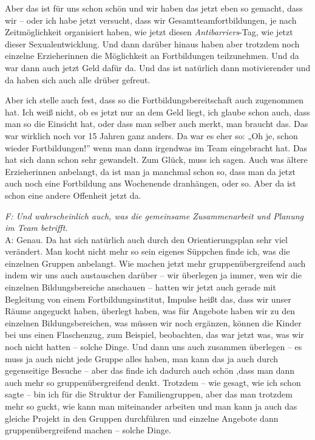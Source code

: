 \begin{linenumbers*}
Aber das ist für uns schon schön und wir haben das jetzt eben so gemacht, dass wir – oder ich habe jetzt versucht, dass wir Gesamtteamfortbildungen, je nach Zeitmöglichkeit organisiert haben, wie jetzt diesen \emph{Antibarriers}-Tag, wie jetzt dieser Sexualentwicklung. Und dann darüber hinaus haben aber trotzdem noch einzelne Erzieherinnen die Möglichkeit an Fortbildungen teilzunehmen. Und da war dann auch jetzt Geld dafür da. Und das ist natürlich dann motivierender und da haben sich auch alle drüber gefreut. 

Aber ich stelle auch fest, dass so die Fortbildungsbereitschaft auch zugenommen hat. Ich weiß nicht, ob es jetzt nur an dem Geld liegt, ich glaube schon auch, dass man so die Einsicht hat, oder dass man selber auch merkt, man braucht das. Das war wirklich noch vor 15 Jahren ganz anders. Da war es eher so: „Oh je, schon wieder Fortbildungen!” wenn man dann irgendwas im Team eingebracht hat. Das hat sich dann schon sehr gewandelt. Zum Glück, muss ich sagen. Auch was ältere Erzieherinnen anbelangt, da ist man ja manchmal schon so, dass man da jetzt auch noch eine Fortbildung ans Wochenende dranhängen, oder so. Aber da ist schon eine andere Offenheit jetzt da. 

\emph{F: Und wahrscheinlich auch, was die gemeinsame Zusammenarbeit und Planung im Team betrifft.}\\
A: Genau. Da hat sich natürlich auch durch den Orientierungsplan sehr viel verändert. Man kocht nicht mehr so sein eigenes Süppchen finde ich, was die einzelnen Gruppen anbelangt. Wie machen jetzt mehr gruppenübergreifend auch indem wir uns auch austauschen darüber – wir überlegen ja immer, wen wir die einzelnen Bildungsbereiche anschauen – hatten wir jetzt auch gerade mit Begleitung von einem Fortbildungsinstitut, Impulse heißt das, dass wir unser Räume angeguckt haben, überlegt haben, was für Angebote haben wir zu den einzelnen Bildungsbereichen, was müssen wir noch ergänzen, können die Kinder bei uns einen Flaschenzug, zum Beispiel, beobachten, das war jetzt was, was wir noch nicht hatten – solche Dinge. Und dann uns auch zusammen überlegen – es muss ja auch nicht jede Gruppe alles haben, man kann das ja auch durch gegenseitige Besuche – aber das finde ich dadurch auch schön ,dass man dann auch mehr so gruppenübergreifend denkt. Trotzdem – wie gesagt, wie ich schon sagte – bin ich für die Struktur der Familiengruppen, aber das man trotzdem mehr so guckt, wie kann man miteinander arbeiten und man kann ja auch das gleiche Projekt in den Gruppen durchführen und einzelne Angebote dann gruppenübergreifend machen – solche Dinge. 


\end{linenumbers*}
